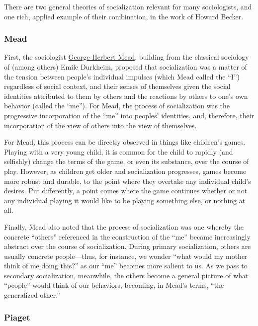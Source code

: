 \documentclass[
  letterpaper,
  DIV=11,
  numbers=noendperiod,
  oneside]{scrartcl}
\begin{document}
There are two general theories of socialization relevant for many
sociologists, and one rich, applied example of their combination, in the
work of Howard Becker.

\subsubsection{Mead}\label{mead}

First, the sociologist
\href{https://en.wikipedia.org/wiki/George_Herbert_Mead}{George Herbert
Mead}, building from the classical sociology of (among others) Emile
Durkheim, proposed that socialization was a matter of the tension
between people's individual impulses (which Mead called the ``I'')
regardless of social context, and their senses of themselves given the
social identities attributed to them by others and the reactions by
others to one's own behavior (called the ``me''). For Mead, the process
of socialization was the progressive incorporation of the ``me'' into
peoples' identities, and, therefore, their incorporation of the view of
others into the view of themselves.

For Mead, this process can be directly observed in things like
children's games. Playing with a very young child, it is common for the
child to rapidly (and selfishly) change the terms of the game, or even
its substance, over the course of play. However, as children get older
and socialization progresses, games become more robust and durable, to
the point where they overtake any individual child's desires. Put
differently, a point comes where the game continues whether or not any
individual playing it would like to be playing something else, or
nothing at all.

Finally, Mead also noted that the process of socialization was one
whereby the concrete ``others'' referenced in the construction of the
``me'' became increasingly abstract over the course of socialization.
During primary socialization, others are usually concrete people---thus,
for instance, we wonder ``what would my mother think of me doing this?''
as our ``me'' becomes more salient to us. As we pass to secondary
socialization, meanwhile, the others become a general picture of what
``people'' would think of our behaviors, becoming, in Mead's terms,
``the generalized other.''

\subsubsection{Piaget}\label{piaget}
\end{document}
